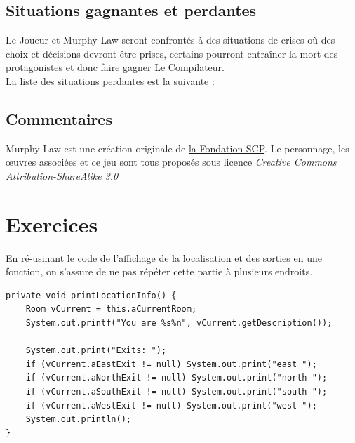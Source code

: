 \documentclass[a4paper,12pt]{report}
\begin{document}
\section{Situations gagnantes et perdantes}

Le Joueur et Murphy Law seront confrontés à des situations de crises où des choix et décisions devront être prises, certains pourront entraîner la mort des protagonistes et donc faire gagner Le Compilateur.\\
La liste des situations perdantes est la suivante :

\begin{description}[align=left,leftmargin=!,labelwidth=\widthof{\bfseries A Buckingham Palace}]
  \item [Sur l'USS Enterprise]
  \item [Dans la pyramide]
  \item [A Buckingham Palace] 
\end{description}

\section{Commentaires}

Murphy Law est une création originale de \href{http://scp-wiki.wikidot.com/murphy-law-hub}{la Fondation SCP}. Le personnage, les œuvres associées et ce jeu sont tous proposés sous licence \emph{Creative Commons Attribution-ShareAlike 3.0}


\chapter{Exercices}

\setcounter{section}{7}
\setcounter{exercise}{4}


\begin{exercise}[subtitle=printLocationInfo]

En ré-usinant le code de l'affichage de la localisation et des sorties en une fonction, on s'assure de ne pas répéter cette partie à plusieurs endroits.

\begin{verbatim}
private void printLocationInfo() {
    Room vCurrent = this.aCurrentRoom;
    System.out.printf("You are %s%n", vCurrent.getDescription());
   
    System.out.print("Exits: ");
    if (vCurrent.aEastExit != null) System.out.print("east ");
    if (vCurrent.aNorthExit != null) System.out.print("north ");
    if (vCurrent.aSouthExit != null) System.out.print("south ");
    if (vCurrent.aWestExit != null) System.out.print("west ");
    System.out.println();
}
\end{verbatim}

\end{exercise}
\end{document}
